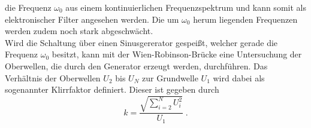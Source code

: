die Frequenz $\omega_0$ aus einem kontinuierlichen Frequenzspektrum und kann somit als elektronischer Filter angesehen werden. Die um $\omega_0$
herum liegenden Frequenzen werden zudem noch stark abgeschwächt.
\\\noindent
Wird die Schaltung über einen Sinusgererator gespeißt, welcher gerade die Frequenz $\omega_0$ besitzt, kann mit der Wien-Robinson-Brücke
eine Untersuchung der Oberwellen, die durch den Generator erzeugt werden, durchführen. Das Verhältnis der Oberwellen $U_2$ bis $U_N$ zur
Grundwelle $U_1$ wird dabei als sogenannter Klirrfaktor definiert. Dieser ist gegeben durch
\begin{equation}
    k=\frac{\sqrt{\sum_{i=2}^N U_i^2}}{U_1}\;.
\end{equation}

%
